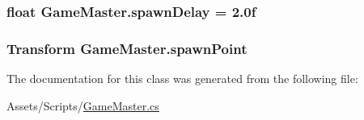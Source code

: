 \subsubsection[{spawn\+Delay}]{\setlength{\rightskip}{0pt plus 5cm}float Game\+Master.\+spawn\+Delay = 2.\+0f}\label{class_game_master_a1d87aa56643ac05f8b36631610bf1093}
\hypertarget{class_game_master_a09f56fd1553c0f3b240da4272294eaae}{}
\subsubsection[{spawn\+Point}]{\setlength{\rightskip}{0pt plus 5cm}Transform Game\+Master.\+spawn\+Point}\label{class_game_master_a09f56fd1553c0f3b240da4272294eaae}


The documentation for this class was generated from the following file\+:\begin{DoxyCompactItemize}
\item 
Assets/\+Scripts/\hyperlink{_game_master_8cs}{Game\+Master.\+cs}\end{DoxyCompactItemize}
